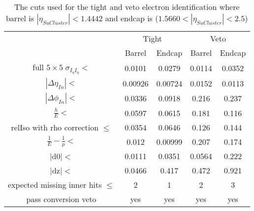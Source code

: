 \begin{table}[htpb!]
\footnotesize
\begin{center}
\begin{tabular}{c|c|c|c|c}
\hline
& \multicolumn{2}{c|}{Tight} & \multicolumn{2}{c}{Veto} \\
\cline{2-5}
&  Barrel        &   Endcap  &  Barrel        &   Endcap  \\

\hline
full $5\times5 \; \sigma_{I_{\eta}I_{\eta}} < $ & 0.0101 & 0.0279 & 0.0114 & 0.0352\\
$|\Delta \eta_{In}| < $  & 0.00926 & 0.00724  & 0.0152 & 0.0113  \\
$|\Delta \phi_{In}| < $  &  0.0336 & 0.0918 &  0.216 & 0.237  \\
$\frac{h}{E} <$ &0.0597 & 0.0615  &0.181 & 0.116  \\
relIso with rho correction  $\leq$  & 0.0354 & 0.0646& 0.126 & 0.144\\
$\frac{1}{E} - \frac{1}{p} < $ & 0.012 & 0.00999  & 0.207 & 0.174 \\
$|$d$0| < $  & 0.0111 & 0.0351  & 0.0564 & 0.222\\
$|$dz$| < $  & 0.0466 & 0.417 & 0.472 & 0.921\\
expected missing inner hits $\leq$ & 2 & 1 & 2 & 3  \\
pass conversion veto & yes & yes& yes & yes  \\
\hline
\end{tabular}
\caption{The cuts used for the tight and veto electron identification where barrel is $|\eta_{SuCluster}|< 1.4442$ and endcap is  ($1.5660<|\eta_{SuCluster}|<2.5$)}
\label{tab:electron_tight_cuts}
\end{center}
\end{table}


